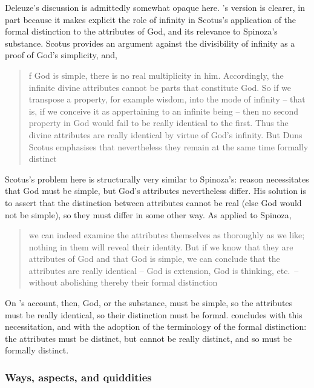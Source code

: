 \documentclass[11pt]{article}
\begin{document}
	Deleuze's discussion is admittedly somewhat opaque here. 's version is clearer, in part because it makes explicit the role of infinity in Scotus's application of the formal distinction to the attributes of God, and its relevance to Spinoza's substance. Scotus provides an argument against the divisibility of infinity as a proof of God's simplicity, and, 
		\blockcquote[91--92]{schmidtFormalDistinction}[.]{
			f God is simple, there is no real multiplicity in him. Accordingly, the infinite divine attributes cannot be parts that constitute God. So if we transpose a property, for example wisdom, into the mode of infinity -- that is, if we conceive it as appertaining to an infinite being -- then no second property in God would fail to be really identical to the first. Thus the divine attributes are really identical by virtue of God’s infinity. But Duns Scotus emphasises that nevertheless they remain at the same time formally distinct}
	Scotus's problem here is structurally very similar to Spinoza's: reason necessitates that God must be simple, but God's attributes nevertheless differ. His solution is to assert that the distinction between attributes cannot be real (else God would not be simple), so they must differ in some other way. As applied to Spinoza, 
		\blockcquote[93]{schmidtFormalDistinction}[.]{
	we can indeed examine the attributes themselves as thoroughly as we like; nothing in them will reveal their identity. But if we know that they are attributes of God and that God is simple, we can conclude that the attributes are really identical -- God is extension, God is thinking, etc.\ -- without abolishing thereby their formal distinction}
	On \citeauthor{schmidtFormalDistinction}'s account, then, God, or the substance, must be simple, so the attributes must be really identical, so their distinction must be formal.  concludes with this necessitation, and with the adoption of the terminology of the formal distinction: the attributes must be distinct, but cannot be really distinct, and so must be formally distinct.
	
	
	\subsubsection{Ways, aspects, and quiddities} \label{subsubsec:DistinctionsConclusion}
	
\end{document}
